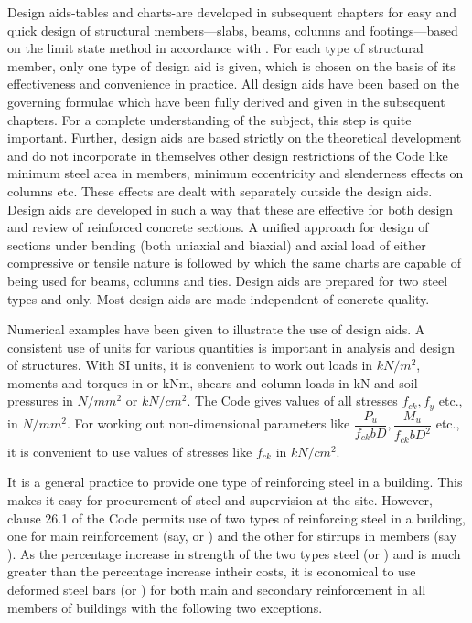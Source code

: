 Design aids-tables and charts-are developed in subsequent chapters for
easy and quick design of structural members—slabs, beams, columns and
footings—based on the limit state method in accordance with
. For each type of structural member, only
one type of design aid is given, which is chosen on the basis of its
effectiveness and convenience in practice. All design aids have been 
based on the governing formulae which have been fully derived and given
in the subsequent chapters. For a complete understanding of the subject,
this step is quite important. Further, design aids are based strictly
on the theoretical development and do not incorporate in themselves other
design restrictions of the Code like minimum steel area in members, minimum
eccentricity and slenderness effects on columns etc. These effects are
dealt with separately outside the design aids. Design aids are developed
in such a way that these are effective for both design and review of
reinforced concrete sections. A unified approach for design of sections
under bending (both uniaxial and biaxial) and axial load of either
compressive or tensile nature is followed by which the same charts are
capable of being used for beams, columns and ties. Design aids are
prepared for two steel types {\fetwofivezero} and {\fefouronefive} only.
Most design aids are made independent of concrete quality.

Numerical examples have been given to illustrate the use of design aids.
A consistent use of units for various quantities is important in analysis
and design of structures. With SI units, it is convenient to work out
loads in $kN/m^2$, moments and torques in or kNm, shears and column
loads in kN and soil pressures in $N/mm^2$ or $kN/cm^2$. The Code
gives values of all stresses $f_{ck}, f_y$ etc., in $N/mm^2$. For working
out non-dimensional parameters like
$\dfrac{P_u}{f_{ck}bD},\dfrac{M_u}{f_{ck}bD^2}$ etc., it is convenient to
use values of stresses like $f_{ck}$ in $kN/cm^2$.


It is a general practice to provide one type of reinforcing steel in a
building. This makes it easy for procurement of steel and supervision 
at the site. However, clause 26.1 of the Code permits use of two types
of reinforcing steel in a building, one for main reinforcement (say,
{\fefouronefive} or {\fefivezerozero}) and the other for stirrups in members
(say {\fetwofivezero}).
As the percentage increase in strength of the two types steel
\fefouronefive
(or {\fefivezerozero}) and {\fetwofivezero} is much greater than the
percentage increase intheir costs, it is economical to use deformed steel
bars {\fefouronefive} (or \fefivezerozero) for both main and secondary
reinforcement in all members of buildings with the following two exceptions.

